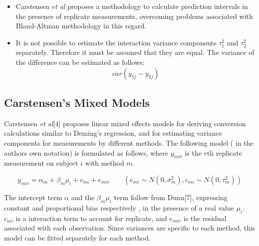 %

%
\Large
\begin{itemize}
\item Carstensen \textit{et al} \cite{BXC2008} proposes a methodology to calculate prediction
intervals in the presence of replicate measurements, overcoming
problems associated with Bland-Altman methodology in this regard.
\item It is not possible to estimate the interaction variance components
$\tau^{2}_{1}$ and $\tau^{2}_{2}$ separately. Therefore it must be
assumed that they are equal. The variance of the difference can be
estimated as follows:
\begin{equation}
var(y_{1j}-y_{2j})
\end{equation}
\end{itemize}

\subsection{Carstensen's Mixed Models}


%
Carstensen \textit{et al}[4] proposes linear mixed effects models for deriving
conversion calculations similar to Deming's regression, and for
estimating variance components for measurements by different
methods. The following model ( in the authors own notation) is
formulated as follows, where $y_{mir}$ is the $r$th replicate
measurement on subject $i$ with method $m$.

\begin{equation}
y_{mir}  = \alpha_{m} + \beta_{m}\mu_{i} + c_{mi} + e_{mir} \qquad
( e_{mi} \sim N(0,\sigma^{2}_{m}), c_{mi} \sim N(0,\tau^{2}_{m}))
\end{equation}

%
The intercept term $\alpha$ and the $\beta_{m}\mu_{i}$ term follow
from Dunn[7], expressing constant and proportional bias
respectively , in the presence of a real value $\mu_{i}.$
 $c_{mi}$ is a interaction term to account for replicate, and
 $e_{mir}$ is the residual associated with each observation.
Since variances are specific to each method, this model can be
fitted separately for each method.

